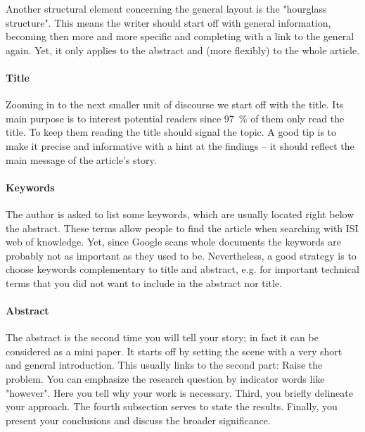 \documentclass{tufte-book}
\begin{document}
Another structural element concerning the general layout is the "hourglass structure". This means the writer should start off with general information, becoming then more and more specific and completing with a link to the general again. Yet, it only applies to the abstract and (more flexibly) to the whole article.\\
 
\paragraph{Title}
Zooming in to the next smaller unit of discourse we start off with the title. %
Its main purpose is to interest potential readers since 97~\%  of them only read the title. To keep them reading the title should signal the topic. A good tip is to make it precise and informative with a hint at the findings -- it should reflect the main message of the article's story.\\

\paragraph{Keywords}
The author is asked to list some keywords, %
which are usually located right below the abstract. These terms allow people to find the article when searching with ISI web of knowledge. Yet, since Google scans whole documents the keywords are probably not as important as they used to be. Nevertheless, a good strategy is to choose keywords complementary to title and abstract, e.g. for important technical terms that you
did not want to include in the abstract nor title.\\

\paragraph{Abstract}
The abstract %
is the second time you will tell your story; in fact it can be considered as a mini paper. It starts off by setting the scene with a very short and general introduction. This usually links to the second part: Raise the problem. You can emphasize the research question by indicator words like "however". Here you tell why your work is necessary. Third, you briefly delineate your approach. The fourth subsection serves to state the results. Finally, you present your conclusions and discuss the broader significance.\\
\end{document}
